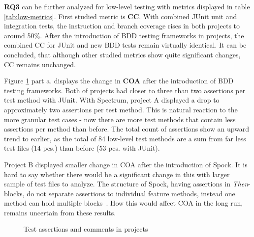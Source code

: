 \textbf{RQ3} can be further analyzed for low-level testing with metrics displayed in table \ref{tab:low-metrics}.
First studied metric is \textbf{CC}. With combined JUnit unit and integration tests, the instruction and branch coverage rises in both projects
to around 50\%. After the introduction of BDD testing frameworks in projects, the combined CC for JUnit and new BDD tests remain
virtually identical. It can be concluded, that although other studied metrics show quite significant changes, CC remains
unchanged.

Figure \ref{fig:coa-coc} part a. displays the change in \textbf{COA} after the introduction of BDD testing frameworks. Both of projects had closer to three
than two assertions per test method with JUnit. With Spectrum, project A displayed a drop to approximately
two assertions
per test method. This is natural reaction to the more   \noindent granular test cases - now there are more test methods that contain
less assertions per method than before. The total count of assertions show an upward trend to earlier, as the total of 84 low-level
test methods are a sum from far less test files (14 pcs.) than before (53 pcs. with JUnit).

Project B displayed smaller change in COA after the introduction of Spock. It is hard to say whether there would be a significant
change in this with larger sample of test files to analyze. The structure of Spock, having assertions in \textit{Then}-blocks,
do not separate assertions to individual feature methods, instead one method can hold multiple blocks~\cite{spock}. How
this would affect COA in the long run, remains uncertain from these results.

    \begin{figure}[H]%
        \centering
        \qquad
        \caption{Test assertions and comments in projects}%
        \label{fig:coa-coc}%
    \end{figure}

